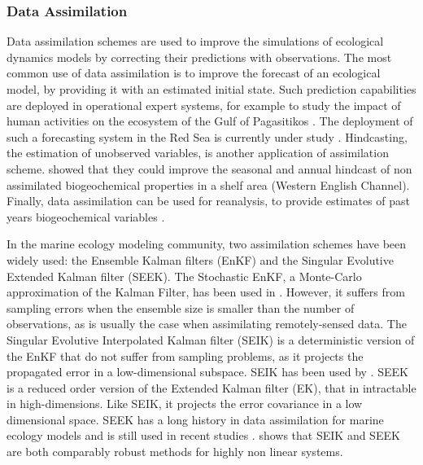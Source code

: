 \subsubsection{Data Assimilation}

Data assimilation schemes are used to improve the simulations of ecological dynamics models by correcting their predictions with observations. The most common use of data assimilation is to improve the forecast of an ecological model, by providing it with an estimated initial state. Such prediction capabilities are deployed in operational expert systems, for example to study the impact of human activities on the ecosystem of the Gulf of Pagasitikos \cite{Korres2012}. The deployment of such a forecasting system in the Red Sea is currently under study \cite{Triantafyllou2014}. Hindcasting, the estimation of unobserved variables, is another application of assimilation scheme. \cite{Ciavatta2011}  showed that they could improve the seasonal and annual hindcast of non assimilated biogeochemical properties in a shelf area (Western English Channel). Finally, data assimilation can be used for reanalysis, to provide estimates of past years biogeochemical variables \cite{Fontana2013}. 

In the marine ecology modeling community, two assimilation schemes have been widely used: the Ensemble Kalman filters (EnKF) and the Singular Evolutive Extended Kalman filter (SEEK). The Stochastic EnKF, a Monte-Carlo approximation of the Kalman Filter, has been used in \cite{Ciavatta2011, Ciavatta2014}. However, it suffers from sampling errors when the ensemble size is smaller than the number of observations, as is usually the case when assimilating remotely-sensed data. The Singular Evolutive Interpolated Kalman filter (SEIK) is a deterministic version of the EnKF that do not suffer from sampling problems, as it projects the propagated error in a low-dimensional subspace. SEIK has been used by \cite{Triantafyllou2012, Korres2012}. SEEK is a reduced order version of the Extended Kalman filter (EK), that in intractable in high-dimensions. Like SEIK, it projects the error covariance in a low dimensional space. SEEK has a long history in data assimilation for marine ecology models and is still used in recent studies \cite{Fontana2013, Korres2012, Butenschon2012}. \cite{Korres2012} shows that SEIK and SEEK are both comparably robust methods for highly non linear systems.

